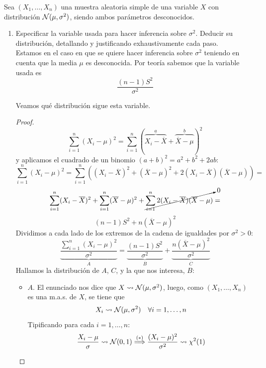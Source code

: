 \documentclass[12pt]{article}
\begin{document}
    \begin{ejercicio}[2 puntos]
        Sea $(X_1,\ldots,X_n)$ una muestra aleatoria simple de una variable $X$ con distribución $\mathcal{N}(\mu,\sigma^2)$, siendo ambos parámetros desconocidos.
        \begin{enumerate}[label=\alph*)]
            \item Especificar la variable usada para hacer inferencia sobre $\sigma^2$. Deducir su distribución, detallando y justificando exhaustivamente cada paso. \\
            
                Estamos en el caso en que se quiere hacer inferencia sobre $\sigma^2$ teniendo en cuenta que la media $\mu$ es desconocida. Por teoría
                sabemos que la variable usada es $$\dfrac{(n-1)S^2}{\sigma^2}$$

                Veamos qué distribución sigue esta variable.
                \begin{proof}
                    $$\sum_{i=1}^{n} (X_i - \mu)^2 = \sum_{i=1}^{n} (\overbrace{X_i - \overline{X}}^{a} + 
                    \overbrace{\overline{X} - \mu}^{b})^2$$
                    y aplicamos el cuadrado de un binomio $(a+b)^2 = a^2 + b^2 + 2ab$:
                    $$\sum_{i=1}^{n} (X_i - \mu)^2 = \sum_{i=1}^{n} ((X_i - \overline{X})^2 + (\overline{X} - \mu)^2
                    + 2 (X_i - \overline{X})(\overline{X} - \mu)) = $$
                    $$\sum_{i=1}^{n} (X_i - \overline{X})^2 + \sum_{i=1}^{n} (\overline{X} - \mu)^2 + 
                    \cancelto{0}{\sum_{i=1}^{n} 2 (X_i - \overline{X})(\overline{X} - \mu)} = $$
                    $$(n-1)S^2 + n (\overline{X} - \mu)^2$$
                    Dividimos a cada lado de los extremos de la cadena de igualdades por $\sigma^2 > 0$:
                    $$\underbrace{\dfrac{\sum_{i=1}^{n} (X_i - \mu)^2}{\sigma^2}}_{A} = 
                    \underbrace{\dfrac{(n-1)S^2}{\sigma^2}}_B + 
                    \underbrace{\dfrac{n (\overline{X} - \mu)^2}{\sigma^2}}_C$$
                    Hallamos la distribución de $A$, $C$, y la que nos interesa, $B$: 
                    \begin{itemize}
                        \item $A$. El enunciado nos dice que $X \rightsquigarrow \mathcal{N}(\mu, \sigma^2)$, luego, 
                        como $(X_1, \ldots, X_{n})$ es una m.a.s. de $X$, se tiene que $$X_i \rightsquigarrow \mathcal{N}(\mu, \sigma^2) \quad
                        \forall i = 1, \ldots, n$$ Tipificando para cada $i = 1, \ldots, n$:
                        $$\dfrac{X_i - \mu}{\sigma} \rightsquigarrow \mathcal{N}(0,1) \stackrel{(*)}{\Longrightarrow} 
                        \dfrac{(X_i - \mu)^2}{\sigma^2} \rightsquigarrow \chi^2(1)$$


\end{itemize}
\end{proof}
\end{enumerate}
\end{ejercicio}
\end{document}
